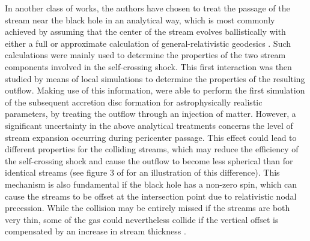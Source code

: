 \documentclass[a4paper,fleqn,usenatbib]{mnras}
\begin{document}
In another class of works, the authors have chosen to treat the passage of the stream near the black hole in an analytical way, which is most commonly achieved by assuming that the center of the stream evolves ballistically with either a full or approximate calculation of general-relativistic geodesics \citep{dai2013,guillochon2015,dai2015,bonnerot2017-stream,lu2020}. Such calculations were mainly used to determine the properties of the two stream components involved in the self-crossing shock. This first interaction was then studied by means of local simulations \citep{lee1996,kim1999,jiang2016,lu2020} to determine the properties of the resulting outflow. Making use of this information, \citet{bonnerot2020-realistic} were able to perform the first simulation of the subsequent accretion disc formation for astrophysically realistic parameters, by treating the outflow through an injection of matter. However, a significant uncertainty in the above analytical treatments concerns the level of stream expansion occurring during pericenter passage. This effect could lead to different properties for the colliding streams, which may reduce the efficiency of the self-crossing shock and cause the outflow to become less spherical than for identical streams (see figure 3 of \cite{bonnerot2021-review} for an illustration of this difference). This mechanism is also fundamental if the black hole has a non-zero spin, which can cause the streams to be offset at the intersection point due to relativistic nodal precession. While the collision may be entirely missed if the streams are both very thin, some of the gas could nevertheless collide if the vertical offset is compensated by an increase in stream thickness \citep{dai2013,guillochon2015,hayasaki2016-spin,liptai2019-spin}.
\end{document}

